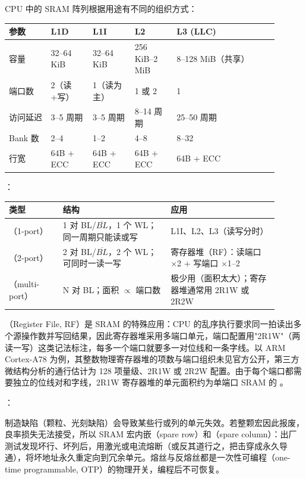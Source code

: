 CPU 中的 SRAM 阵列根据用途有不同的组织方式：

\begin{longtable}{L{0.14\linewidth}L{0.14\linewidth}L{0.14\linewidth}L{0.14\linewidth}L{0.34\linewidth}}
\toprule
参数 & L1D & L1I & L2 & L3 (LLC) \\
\midrule
容量 & 32--64 KiB & 32--64 KiB & 256 KiB--2 MiB & 8--128 MiB（共享） \\
端口数 & 2（读+写） & 1（读为主） & 1 或 2 & 1 \\
访问延迟 & 3--5 周期 & 3--5 周期 & 8--14 周期 & 25--50 周期 \\
Bank 数 & 2--4 & 1--2 & 4--8 & 8--32 \\
行宽 & 64B + ECC & 64B + ECC & 64B + ECC & 64B + ECC \\
\bottomrule
\end{longtable}

：

\begin{longtable}{L{0.18\linewidth}L{0.36\linewidth}L{0.36\linewidth}}
\toprule
类型 & 结构 & 应用 \\
\midrule
{}（1-port） & 1 对 BL/$\overline{BL}$，1 个 WL；同一周期只能读或写 & L1I、L2、L3（读写分时） \\
（2-port） & 2 对 BL/$\overline{BL}$，2 个 WL；可同时一读一写 & 寄存器堆（RF）：读端口 $\times$2 + 写端口 $\times$1--2 \\
（multi-port） & N 对 BL；面积 $\propto$ 端口数 & 极少用（面积太大）；寄存器堆通常用 2R1W 或 2R2W \\
\bottomrule
\end{longtable}

（Register File, RF）是 SRAM 的特殊应用：CPU 的乱序执行要求同一拍读出多个源操作数并写回结果，因此寄存器堆采用多端口单元，端口配置用"2R1W"（两读一写）这类记法标注，每多一个端口就要多一对位线和一条字线。以 ARM Cortex-A78 为例，其整数物理寄存器堆的项数与端口组织未见官方公开，第三方微结构分析的通行估计为 128 项量级、2R1W 或 2R2W 配置。由于每个端口都需要独立的位线对和字线，2R1W 寄存器堆的单元面积约为单端口 SRAM 的 。

：

制造缺陷（颗粒、光刻缺陷）会导致某些行或列的单元失效。若整颗宏因此报废，良率损失无法接受，所以 SRAM 宏内嵌（spare row）和（spare column）：出厂测试发现坏行、坏列后，用激光或电流熔断（或反其道行之，把击穿成永久导通），将坏地址永久重定向到冗余单元。熔丝与反熔丝都是一次性可编程（one-time programmable, OTP）的物理开关，编程后不可恢复。

